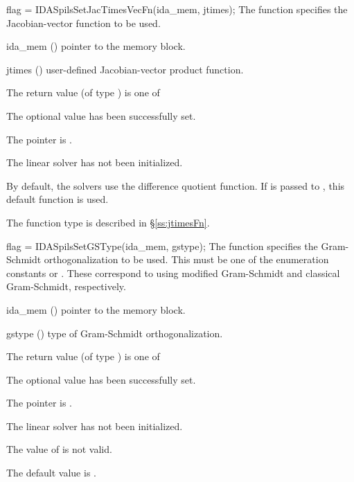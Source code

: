 {{}
{
  flag = IDASpilsSetJacTimesVecFn(ida\_mem, jtimes);
}
{
  The function  specifies the Jacobian-vector 
  function to be used.
}
{
  \begin{args}
  \item[ida\_mem] ()
    pointer to the {\idas} memory block.
  \item[jtimes] ()
    user-defined Jacobian-vector product function.
  \end{args}
}
{
  The return value  (of type ) is one of
  \begin{args}
  \item[\Id{IDASPILS\_SUCCESS}] 
    The optional value has been successfully set.
  \item[\Id{IDASPILS\_MEM\_NULL}]
    The  pointer is .
  \item[\Id{IDASPILS\_LMEM\_NULL}]
    The {\idaspils} linear solver has not been initialized.
  \end{args}
}
{
  By default, the {\idaspils} solvers use the difference quotient function. 
  If  is passed to , this default function is used.

  The function type  is described in \S\ref{ss:jtimesFn}.
}
{
  flag = IDASpilsSetGSType(ida\_mem, gstype);
}
{
  The function  specifies the 
  Gram-Schmidt orthogonalization to be used. 
  This must be one of the enumeration constants 
  or . These correspond to using modified Gram-Schmidt 
  and classical Gram-Schmidt, respectively. 
}
{
  \begin{args}
  \item[ida\_mem] ()
    pointer to the {\idas} memory block.
  \item[gstype] ()
    type of Gram-Schmidt orthogonalization.
  \end{args}
}
{
  The return value  (of type ) is one of
  \begin{args}
  \item[\Id{IDASPILS\_SUCCESS}] 
    The optional value has been successfully set.
  \item[\Id{IDASPILS\_MEM\_NULL}]
    The  pointer is .
  \item[\Id{IDASPILS\_LMEM\_NULL}]
    The {\idaspils} linear solver has not been initialized.
  \item[\Id{IDASPILS\_ILL\_INPUT}]
    The value of  is not valid.
  \end{args}
}
{
  The default value is .

}}
